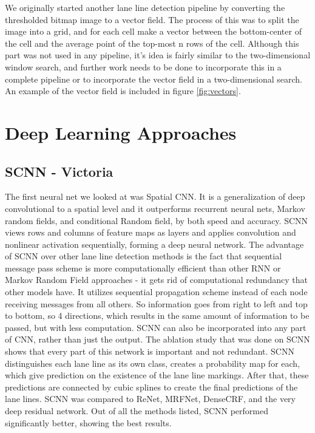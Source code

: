 \documentclass[twoside,twocolumn]{article}
\begin{document}
\par We originally started another lane line detection pipeline by converting the thresholded bitmap image to a vector field. The process of this was to split the image into a grid, and for each cell make a vector between the bottom-center of the cell and the average point of the top-most n rows of the cell. Although this part was not used in any pipeline, it's idea is fairly similar to the two-dimensional window search, and further work needs to be done to incorporate this in a complete pipeline or to incorporate the vector field in a two-dimensional search. An example of the vector field is included in figure \ref{fig:vectors}.



\section{Deep Learning Approaches}

\subsection{SCNN - Victoria}
\par The first neural net we looked at was Spatial CNN. It is a generalization of deep convolutional to a spatial level and it outperforms recurrent neural nets, Markov random fields, and conditional Random field, by both speed and accuracy.  SCNN views rows and columns of feature maps as layers and applies convolution and nonlinear activation sequentially, forming a deep neural network. The advantage of SCNN over other lane line detection methods is the fact that sequential message pass scheme is more computationally efficient than other RNN or Markov Random Field approaches - it gets rid of computational redundancy that other models have. It utilizes sequential propagation scheme instead of each node receiving messages from all others. So information goes  from right to left and top to bottom, so 4 directions, which results in the same amount of information to be passed, but with less computation. SCNN can also be incorporated into any part of CNN, rather than just the output. The ablation study that was done on SCNN shows that every part of this network is important  and not redundant. SCNN distinguishes each lane line as its own class, creates a probability map for each, which give prediction on the existence of the lane line markings. After that, these predictions are connected by cubic splines to create the final predictions of the lane lines. SCNN was compared to ReNet, MRFNet, DenseCRF, and the very deep residual network. Out of all the methods listed, SCNN performed significantly better, showing the best results.
\end{document}
